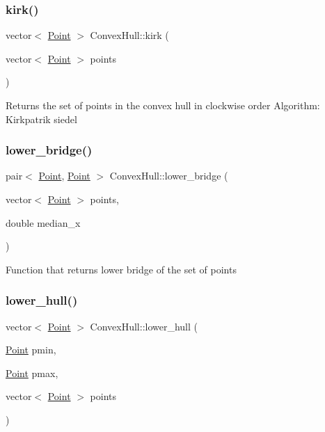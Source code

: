 \subsubsection{\texorpdfstring{kirk()}{kirk()}}
{\footnotesize\ttfamily vector$<$ \hyperlink{classPoint}{Point} $>$ Convex\+Hull\+::kirk (\begin{DoxyParamCaption}\item[{vector$<$ \hyperlink{classPoint}{Point} $>$}]{points }\end{DoxyParamCaption})}

Returns the set of points in the convex hull in clockwise order Algorithm\+: Kirkpatrik siedel \mbox{\label{classConvexHull_a8e3d1304a5aa148d020a279db93ac65e}} 
\subsubsection{\texorpdfstring{lower\+\_\+bridge()}{lower\_bridge()}}
{\footnotesize\ttfamily pair$<$ \hyperlink{classPoint}{Point}, \hyperlink{classPoint}{Point} $>$ Convex\+Hull\+::lower\+\_\+bridge (\begin{DoxyParamCaption}\item[{vector$<$ \hyperlink{classPoint}{Point} $>$}]{points,  }\item[{double}]{median\+\_\+x }\end{DoxyParamCaption})\hspace{0.3cm}{\ttfamily [private]}}

Function that returns lower bridge of the set of points \mbox{\label{classConvexHull_a2fd80a61b1996d7f58ce071fc7a5e33c}} 
\subsubsection{\texorpdfstring{lower\+\_\+hull()}{lower\_hull()}}
{\footnotesize\ttfamily vector$<$ \hyperlink{classPoint}{Point} $>$ Convex\+Hull\+::lower\+\_\+hull (\begin{DoxyParamCaption}\item[{\hyperlink{classPoint}{Point}}]{pmin,  }\item[{\hyperlink{classPoint}{Point}}]{pmax,  }\item[{vector$<$ \hyperlink{classPoint}{Point} $>$}]{points }\end{DoxyParamCaption})\hspace{0.3cm}{\ttfamily [private]}}

